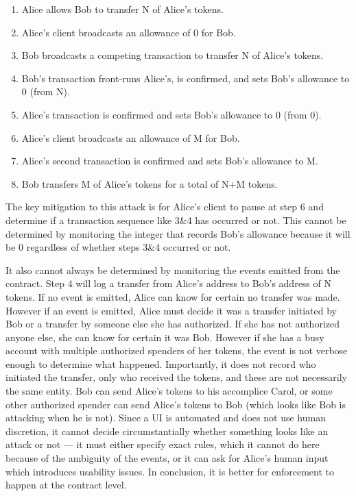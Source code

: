 \begin{enumerate}
	\item Alice allows Bob to transfer N of Alice's tokens.
	\item Alice's client broadcasts an allowance of 0 for Bob.
	\item Bob broadcasts a competing transaction to transfer N of Alice’s tokens.
	\item Bob's transaction front-runs Alice's, is confirmed, and sets Bob’s allowance to 0 (from N).
	\item Alice’s transaction is confirmed and sets Bob’s allowance to 0 (from 0).
	\item Alice's client broadcasts an allowance of M for Bob.
	\item Alice’s second transaction is confirmed and sets Bob's allowance to M.
	\item Bob transfers M of Alice’s tokens for a total of N+M tokens.
\end{enumerate}

The key mitigation to this attack is for Alice's client to pause at step 6 and determine if a transaction sequence like 3\&4 has occurred or not. This cannot be determined by monitoring the integer that records Bob's allowance because it will be 0 regardless of whether steps 3\&4 occurred or not. 

It also cannot always be determined by monitoring the events emitted from the contract. Step 4 will log a transfer from Alice's address to Bob's address of N tokens. If no event is emitted, Alice can know for certain no transfer was made. However if an event is emitted, Alice must decide it was a transfer initiated by Bob or a transfer by someone else she has authorized. If she has not authorized anyone else, she can know for certain it was Bob. However if she has a busy account with multiple authorized spenders of her tokens, the event is not verbose enough to determine what happened. Importantly, it does not record who initiated the transfer, only who received the tokens, and these are not necessarily the same entity. Bob can send Alice's tokens to his accomplice Carol, or some other authorized spender can send Alice's tokens to Bob (which looks like Bob is attacking when he is not). Since a UI is automated and does not use human discretion, it cannot decide circumstantially whether something looks like an attack or not --- it must either specify exact rules, which it cannot do here because of the ambiguity of the events, or it can ask for Alice's human input which introduces usability issues. In conclusion, it is better for enforcement to happen at the contract level.

